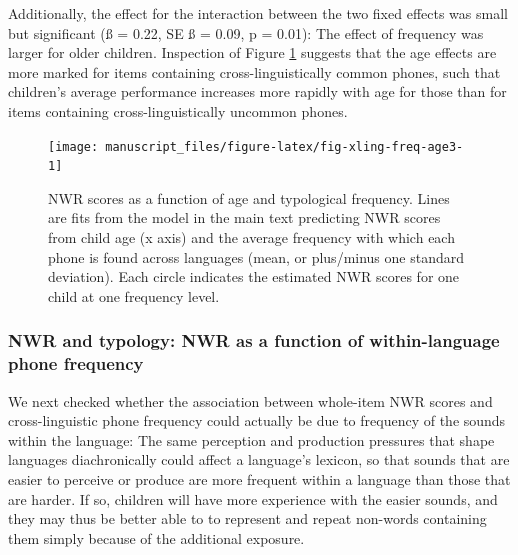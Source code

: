 \documentclass[
  american,
  ,man,floatsintext]{apa6}
\begin{document}
Additionally, the effect for the interaction between the two fixed effects was small but significant (ß = 0.22, SE ß = 0.09, p = 0.01): The effect of frequency was larger for older children. Inspection of Figure \ref{fig:fig-xling-freq-age3} suggests that the age effects are more marked for items containing cross-linguistically common phones, such that children's average performance increases more rapidly with age for those than for items containing cross-linguistically uncommon phones.

\begin{figure}[!t]

{\centering \texttt{[image: manuscript\_files/figure-latex/fig-xling-freq-age3-1]} 

}

\caption{NWR scores as a function of age and typological frequency. Lines are fits from the model in the main text predicting NWR scores from child age (x axis) and the average frequency with which each phone is found across languages (mean, or plus/minus one standard deviation). Each circle indicates the estimated NWR scores for one child at one frequency level.}\label{fig:fig-xling-freq-age3}
\end{figure}

\hypertarget{nwr-and-typology-nwr-as-a-function-of-within-language-phone-frequency}{%
\subsubsection{NWR and typology: NWR as a function of within-language phone frequency}\label{nwr-and-typology-nwr-as-a-function-of-within-language-phone-frequency}}

We next checked whether the association between whole-item NWR scores and cross-linguistic phone frequency could actually be due to frequency of the sounds within the language: The same perception and production pressures that shape languages diachronically could affect a language's lexicon, so that sounds that are easier to perceive or produce are more frequent within a language than those that are harder. If so, children will have more experience with the easier sounds, and they may thus be better able to to represent and repeat non-words containing them simply because of the additional exposure.
\end{document}
